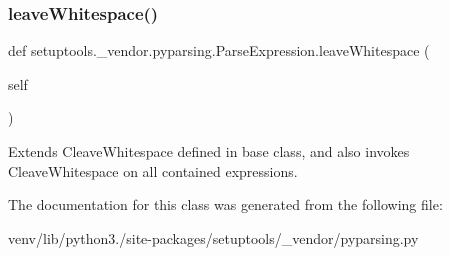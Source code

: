 \subsubsection{\texorpdfstring{leave\+Whitespace()}{leaveWhitespace()}}
{\footnotesize\ttfamily def setuptools.\+\_\+vendor.\+pyparsing.\+Parse\+Expression.\+leave\+Whitespace (\begin{DoxyParamCaption}\item[{}]{self }\end{DoxyParamCaption})}

\begin{DoxyVerb}Extends C{leaveWhitespace} defined in base class, and also invokes C{leaveWhitespace} on
   all contained expressions.\end{DoxyVerb}
 

The documentation for this class was generated from the following file\+:\begin{DoxyCompactItemize}
\item 
venv/lib/python3./site-\/packages/setuptools/\+\_\+vendor/pyparsing.\+py\end{DoxyCompactItemize}
